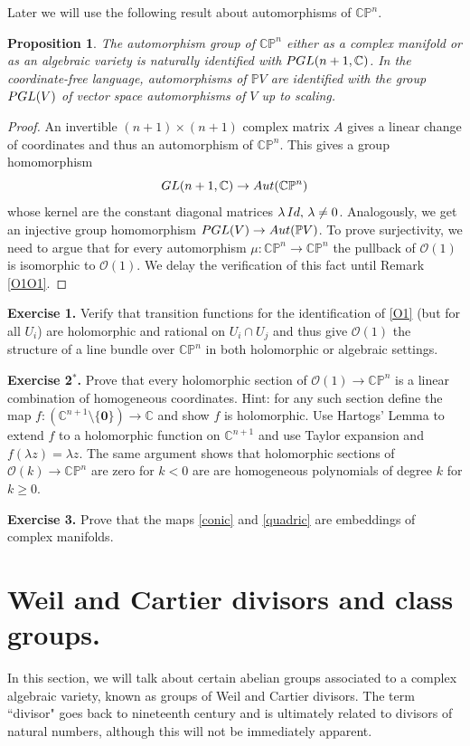 \documentclass[11pt]{article}
\numberwithin{equation}{section}
\numberwithin{footnote}{section}
\newtheorem{prop}[thm]{Proposition}
\newcommand{\blue}{\color{blue}}
\renewcommand{\P}{{\mathbb P}}
\newcommand{\C}{{\mathbb C}}
\begin{document}
\smallskip
Later we will use the following result about automorphisms of $\C\P^n$.
\begin{prop}\label{autoP}
The automorphism group of $\C\P^n$ either as a complex manifold or as an algebraic variety is naturally identified with 
${\rm PGL}(n+1,\C)$. In the coordinate-free language, automorphisms of $\P V$ are identified with the group ${\rm PGL}(V)$
of vector space automorphisms of $V$ up to scaling.
\end{prop}

\begin{proof}
An invertible $(n+1)\times (n+1)$ complex matrix $A$ gives a linear change of coordinates and thus an automorphism of $\C\P^n$. This gives a group homomorphism
$${\rm GL}(n+1,\C)\to{\rm Aut}(\C\P^n)$$
whose kernel  are the constant diagonal matrices $\lambda \,{\rm Id},\,\lambda \neq 0$. Analogously, we get an injective group homomorphism ${\rm PGL}(V)\to{\rm Aut}(\P V)$.
To prove surjectivity, we need to argue that for every automorphism  $\mu:\C\P^n\to \C\P^n$ the pullback of $\mathcal O(1)$ is isomorphic to $\mathcal O(1)$. We delay the verification of this fact until Remark \ref{O1O1}.
\end{proof}



{\bf Exercise 1.} Verify that transition functions for the identification of \eqref{O1} (but for all $U_i$) are holomorphic and rational on $U_i\cap U_j$ and thus give $\mathcal O(1)$ the structure of a line bundle over $\C\P^n$ in both holomorphic or algebraic settings.

{\bf Exercise 2${}^*$.} Prove that every holomorphic section of $\mathcal O(1)\to\C\P^n$ is a linear combination of homogeneous coordinates. Hint: for any such section define the map $f:(\C^{n+1}\setminus\{{\mathbf 0}\})\to \C$ and show $f$ is holomorphic. Use Hartogs' Lemma to extend $f$ to a holomorphic function on $\C^{n+1}$ and use Taylor expansion and $f(\lambda z) = \lambda z$. The same argument shows that holomorphic sections of $\mathcal O(k)\to \C\P^n$ are zero for $k<0$ are are homogeneous polynomials of degree $k$ for $k\geq 0$.

{\bf Exercise 3.} Prove that the maps \eqref{conic} and \eqref{quadric} are embeddings of complex manifolds.


\section{Weil and Cartier divisors and class groups.}
In this section, we will talk about certain abelian groups associated to a complex algebraic variety, known as groups of {\blue Weil and Cartier divisors}. The term ``divisor" goes back to nineteenth century and is ultimately related to divisors of natural numbers, although this will not 
be immediately apparent.
\end{document}
